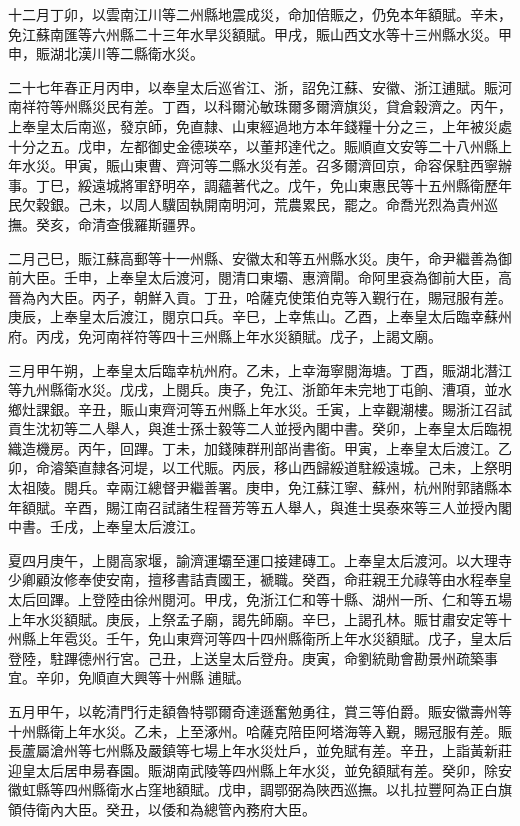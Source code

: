 \begin{pinyinscope}
十二月丁卯，以雲南江川等二州縣地震成災，命加倍賑之，仍免本年額賦。辛未，免江蘇南匯等六州縣二十三年水旱災額賦。甲戌，賑山西文水等十三州縣水災。甲申，賑湖北漢川等二縣衛水災。

二十七年春正月丙申，以奉皇太后巡省江、浙，詔免江蘇、安徽、浙江逋賦。賑河南祥符等州縣災民有差。丁酉，以科爾沁敏珠爾多爾濟旗災，貸倉穀濟之。丙午，上奉皇太后南巡，發京師，免直隸、山東經過地方本年錢糧十分之三，上年被災處十分之五。戊申，左都御史金德瑛卒，以董邦達代之。賑順直文安等二十八州縣上年水災。甲寅，賑山東曹、齊河等二縣水災有差。召多爾濟回京，命容保駐西寧辦事。丁巳，綏遠城將軍舒明卒，調蘊著代之。戊午，免山東惠民等十五州縣衛歷年民欠穀銀。己未，以周人驥固執開南明河，荒農累民，罷之。命喬光烈為貴州巡撫。癸亥，命清查俄羅斯疆界。

二月己巳，賑江蘇高郵等十一州縣、安徽太和等五州縣水災。庚午，命尹繼善為御前大臣。壬申，上奉皇太后渡河，閱清口東壩、惠濟閘。命阿里袞為御前大臣，高晉為內大臣。丙子，朝鮮入貢。丁丑，哈薩克使策伯克等入覲行在，賜冠服有差。庚辰，上奉皇太后渡江，閱京口兵。辛巳，上幸焦山。乙酉，上奉皇太后臨幸蘇州府。丙戌，免河南祥符等四十三州縣上年水災額賦。戊子，上謁文廟。

三月甲午朔，上奉皇太后臨幸杭州府。乙未，上幸海寧閱海塘。丁酉，賑湖北潛江等九州縣衛水災。戊戌，上閱兵。庚子，免江、浙節年未完地丁屯餉、漕項，並水鄉灶課銀。辛丑，賑山東齊河等五州縣上年水災。壬寅，上幸觀潮樓。賜浙江召試貢生沈初等二人舉人，與進士孫士毅等二人並授內閣中書。癸卯，上奉皇太后臨視織造機房。丙午，回蹕。丁未，加錢陳群刑部尚書銜。甲寅，上奉皇太后渡江。乙卯，命濬築直隸各河堤，以工代賑。丙辰，移山西歸綏道駐綏遠城。己未，上祭明太祖陵。閱兵。幸兩江總督尹繼善署。庚申，免江蘇江寧、蘇州，杭州附郭諸縣本年額賦。辛酉，賜江南召試諸生程晉芳等五人舉人，與進士吳泰來等三人並授內閣中書。壬戌，上奉皇太后渡江。

夏四月庚午，上閱高家堰，諭濟運壩至運口接建磚工。上奉皇太后渡河。以大理寺少卿顧汝修奉使安南，擅移書詰責國王，褫職。癸酉，命莊親王允祿等由水程奉皇太后回蹕。上登陸由徐州閱河。甲戌，免浙江仁和等十縣、湖州一所、仁和等五場上年水災額賦。庚辰，上祭孟子廟，謁先師廟。辛巳，上謁孔林。賑甘肅安定等十州縣上年雹災。壬午，免山東齊河等四十四州縣衛所上年水災額賦。戊子，皇太后登陸，駐蹕德州行宮。己丑，上送皇太后登舟。庚寅，命劉統勛會勘景州疏築事宜。辛卯，免順直大興等十州縣逋賦。

五月甲午，以乾清門行走額魯特鄂爾奇達遜奮勉勇往，賞三等伯爵。賑安徽壽州等十州縣衛上年水災。乙未，上至涿州。哈薩克陪臣阿塔海等入覲，賜冠服有差。賑長蘆屬滄州等七州縣及嚴鎮等七場上年水災灶戶，並免賦有差。辛丑，上詣黃新莊迎皇太后居申昜春園。賑湖南武陵等四州縣上年水災，並免額賦有差。癸卯，除安徽虹縣等四州縣衛水占窪地額賦。戊申，調鄂弼為陜西巡撫。以扎拉豐阿為正白旗領侍衛內大臣。癸丑，以倭和為總管內務府大臣。


\end{pinyinscope}
